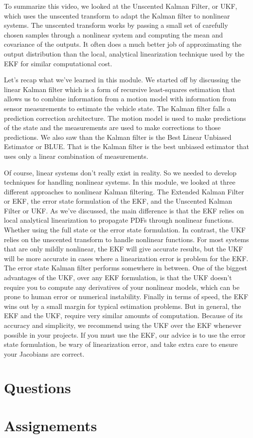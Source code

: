 To summarize this video, we looked at
the Unscented Kalman Filter, or UKF, which uses the unscented transform to adapt
the Kalman filter to nonlinear systems. The unscented transform works
by passing a small set of carefully chosen samples through a nonlinear
system and computing the mean and covariance of the outputs. It often does a much better job of
approximating the output distribution than the local, analytical linearization
technique used by the EKF for similar computational cost. 


Let's recap what we've
learned in this module. We started off by discussing the linear
Kalman filter which is a form of recursive least-squares estimation that allows us to
combine information from a motion model with information from sensor measurements
to estimate the vehicle state. The Kalman filter falls a prediction
correction architecture. The motion model is used to make
predictions of the state and the measurements are used to make
corrections to those predictions. We also saw than the Kalman filter is the
Best Linear Unbiased Estimator or BLUE. That is the Kalman filter is
the best unbiased estimator that uses only a linear
combination of measurements. 

Of course, linear systems
don't really exist in reality. So we needed to develop techniques for
handling nonlinear systems. In this module, we looked at three different approaches
to nonlinear Kalman filtering. The Extended Kalman Filter or EKF,
the error state formulation of the EKF, and the Unscented Kalman Filter or UKF. As we've discussed, the main difference
is that the EKF relies on local analytical linearization to propagate
PDFs through nonlinear functions. Whether using the full state or
the error state formulation. In contrast, the UKF relies on the unscented
transform to handle nonlinear functions. For most systems that
are only mildly nonlinear, the EKF will give accurate results,
but the UKF will be more accurate in cases where a linearization
error is problem for the EKF. The error state Kalman filter
performs somewhere in between. One of the biggest advantages of the UKF,
over any EKF formulation, is that the UKF doesn't require you to compute any
derivatives of your nonlinear models, which can be prone to human error or
numerical instability. Finally in terms of speed,
the EKF wins out by a small margin for typical estimation problems. But in general, the EKF and the UKF, require very similar
amounts of computation. Because of its accuracy and simplicity, we recommend using the UKF over the EKF
whenever possible in your projects. If you must use the EKF, our advice is to
use the error state formulation, be wary of linearization error, and take extra
care to ensure your Jacobians are correct. 

\section{Questions}


\section{Assignements}
